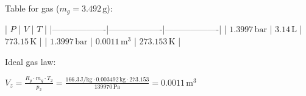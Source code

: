 Table for gas (\( m_g = 3.492 \, \text{g} \)):  

| \( P \)           | \( V \)           | \( T \)           |  
|-------------------|-------------------|-------------------|  
| \( 1.3997 \, \text{bar} \) | \( 3.14 \, \text{L} \) | \( 773.15 \, \text{K} \) |  
| \( 1.3997 \, \text{bar} \) | \( 0.0011 \, \text{m}^3 \) | \( 273.153 \, \text{K} \) |  

Ideal gas law:  

\( V_z = \frac{R_g \cdot m_g \cdot T_2}{p_2} = \frac{166.3 \, \text{J/kg} \cdot 0.003492 \, \text{kg} \cdot 273.153}{139970 \, \text{Pa}} = 0.0011 \, \text{m}^3 \)
